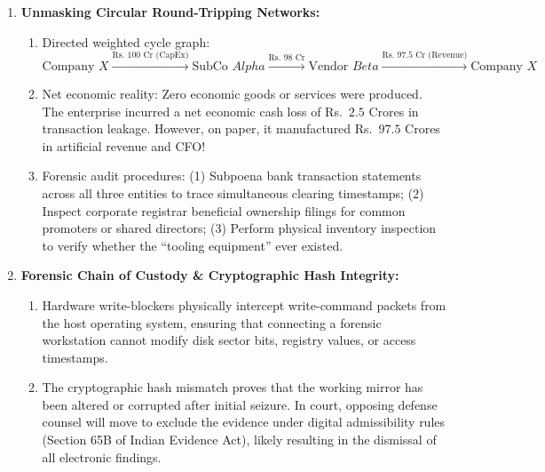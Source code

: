 \begin{enumerate}[label=\textbf{P4.\arabic*}]
    \item \textbf{Unmasking Circular Round-Tripping Networks:}
    \begin{enumerate}[label=(\alph*)]
        \item Directed weighted cycle graph:
        \begin{equation*}
        \text{Company } X \xrightarrow{\text{Rs.~} 100\text{ Cr (CapEx)}} \text{SubCo } Alpha \xrightarrow{\text{Rs.~} 98\text{ Cr}} \text{Vendor } Beta \xrightarrow{\text{Rs.~} 97.5\text{ Cr (Revenue)}} \text{Company } X
        \end{equation*}
        \item Net economic reality: Zero economic goods or services were produced. The enterprise incurred a net economic cash loss of Rs.~$2.5$ Crores in transaction leakage. However, on paper, it manufactured Rs.~$97.5$ Crores in artificial revenue and CFO!
        \item Forensic audit procedures: (1) Subpoena bank transaction statements across all three entities to trace simultaneous clearing timestamps; (2) Inspect corporate registrar beneficial ownership filings for common promoters or shared directors; (3) Perform physical inventory inspection to verify whether the ``tooling equipment'' ever existed.
    \end{enumerate}

    \item \textbf{Forensic Chain of Custody \& Cryptographic Hash Integrity:}
    \begin{enumerate}[label=(\alph*)]
        \item Hardware write-blockers physically intercept write-command packets from the host operating system, ensuring that connecting a forensic workstation cannot modify disk sector bits, registry values, or access timestamps.
        \item The cryptographic hash mismatch proves that the working mirror has been altered or corrupted after initial seizure. In court, opposing defense counsel will move to exclude the evidence under digital admissibility rules (Section 65B of Indian Evidence Act), likely resulting in the dismissal of all electronic findings.
    \end{enumerate}


\end{enumerate}
